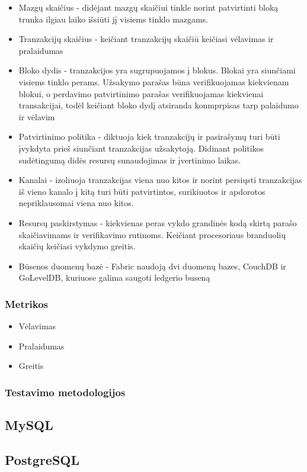 \documentclass{VUMIFPSkursinis}
\begin{document}
			\begin{itemize}
				\item{Mazgų skaičius - didėjant mazgų skaičiui tinkle norint patvirtinti bloką trunka ilgiau laiko išsiūti jį visiems tinklo mazgams.}
				\item{Tranzakcijų skaičius - keičiant tranzakcijų skaičiū keičiasi vėlavimas ir pralaidumas}
				\item{Bloko dydis - tranzakcijos yra sugrupuojamos į blokus. Blokai yra siunčiami visiems tinklo perams. Užsakymo parašas 
būna verifikuojamas kiekvienam blokui, o perdavimo patvirtinimo parašas verifikuojamas kiekvienai transakcijai, todėl keičiant bloko dydį atsiranda konmprpisas tarp palaidumo ir vėlavim}
				\item{Patvirtinimo politika - diktuoja kiek tranzakcijų ir pasirašymų turi būti įvykdyta prieš siunčiant tranzakcijas užsakytoją. Didinant politikos sudėtingumą didės resursų sunaudojimas ir įvertinimo laikas.}
				\item{Kanalai - izoliuoja tranzakcijas viena nuo kitos ir norint persiųsti tranzakcijas iš vieno kanalo į kitą turi būti patvirtintos, surikiuotos ir apdorotos nepriklausomai viena nuo kitos.}
				\item{Resursų paskirstymas - kiekvienas peras vykdo grandinės kodą skirtą parašo skaičiavimams ir verifikavimo rutinoms. Keičiant procesoriaus branduolių skaičių keičiasi vykdymo greitis.}
				\item{Būsenos duomenų bazė - Fabric naudoją dvi duomenų bazes, CouchDB ir GoLevelDB, kuriuose galima saugoti ledgerio buseną}
			\end{itemize}
		\subsubsection{Metrikos}
			\begin{itemize}
				\item{Vėlavimas}
				\item{Pralaidumas}
				\item{Greitis}
			\end{itemize}
		\subsubsection{Testavimo metodologijos}
	\subsection{MySQL}
	\subsection{PostgreSQL}
\end{document}
